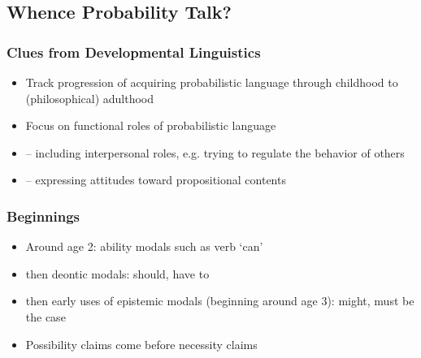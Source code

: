 \subsection{Whence Probability Talk?}

\begin{frame}
\frametitle{Clues from Developmental Linguistics}

\begin{itemize}[<+->]

\item Track progression of acquiring probabilistic language through childhood to (philosophical) adulthood

\item Focus on functional roles of probabilistic language

\item[] -- including interpersonal roles, e.g. trying to regulate the behavior of others

\item[] -- expressing attitudes toward propositional contents


\end{itemize}
\end{frame}

\begin{frame}
\frametitle{Beginnings}

\begin{itemize}[<+->]

\item Around age 2: ability modals such as verb `can'

\item then deontic modals: should, have to

\item then early uses of epistemic modals (beginning around age 3): might, must be the case

\item Possibility claims come before necessity claims


\end{itemize}
\end{frame}


